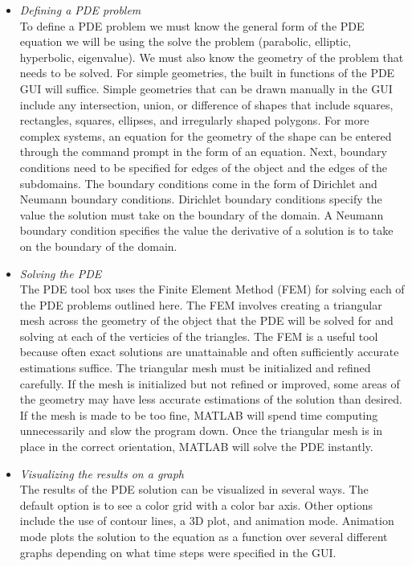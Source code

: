 \documentclass{amsart}
\theoremstyle{definition}
\begin{document}
\begin{itemize}
\item \emph{Defining a PDE problem}\\
To define a PDE problem we must know the general form of the PDE equation we will be using the solve the problem (parabolic, elliptic, hyperbolic, eigenvalue). We must also know the geometry of the problem that needs to be solved. For simple geometries, the built in functions of the PDE GUI will suffice. Simple geometries that can be drawn manually in the GUI include any intersection, union, or difference of shapes that include squares, rectangles, squares, ellipses, and irregularly shaped polygons. For more complex systems, an equation for the geometry of the shape can be entered through the command prompt in the form of an equation. Next, boundary conditions need to be specified for edges of the object and the edges of the subdomains. The boundary conditions come in the form of Dirichlet and Neumann boundary conditions. Dirichlet boundary conditions specify the value the solution must take on the boundary of the domain. A Neumann boundary condition specifies the value the derivative of a solution is to take on the boundary of the domain.
\item \emph{Solving the PDE} \\
The PDE tool box uses the Finite Element Method (FEM) for solving each of the PDE problems outlined here. The FEM involves creating a triangular mesh across the geometry of the object that the PDE will be solved for and solving at each of the verticies of the triangles. The FEM is a useful tool because often exact solutions are unattainable and often sufficiently accurate estimations suffice. The triangular mesh must be initialized and refined carefully. If the mesh is initialized but not refined or improved, some areas of the geometry may have less accurate estimations of the solution than desired. If the mesh is made to be too fine, MATLAB will spend time computing unnecessarily and slow the program down. Once the triangular mesh is in place in the correct orientation, MATLAB will solve the PDE instantly. 
\item \emph{Visualizing the results on a graph} \\
The results of the PDE solution can be visualized in several ways. The default option is to see a color grid with a color bar axis. Other options include the use of contour lines, a 3D plot, and animation mode. Animation mode plots the solution to the equation as a function over several different graphs depending on what time steps were specified in the GUI. 
\end{itemize}
\end{document}

